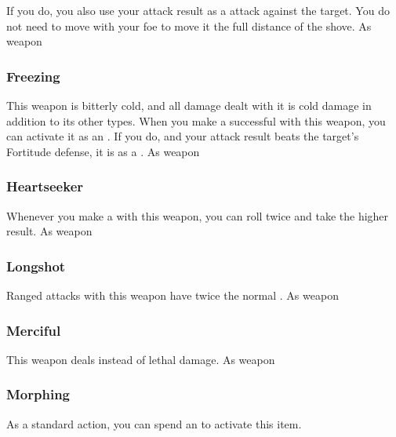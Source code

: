 If you do, you also use your attack result as a  attack against the target.
You do not need to move with your foe to move it the full distance of the shove.
 
 As weapon
\lowercase{\hypertarget{item:Freezing}{}}\label{item:Freezing}
\hypertarget{item:Freezing}{\subsubsection{Freezing\hfill{}}}
This weapon is bitterly cold, and all damage dealt with it is cold damage in addition to its other types.
When you make a successful  with this weapon, you can activate it as an .
If you do, and your attack result beats the target's Fortitude defense, it is \fatigued as a .
 
 As weapon
\lowercase{\hypertarget{item:Heartseeker}{}}\label{item:Heartseeker}
\hypertarget{item:Heartseeker}{\subsubsection{Heartseeker\hfill{}}}
Whenever you make a  with this weapon, you can roll twice and take the higher result.
 
 As weapon
\lowercase{\hypertarget{item:Longshot}{}}\label{item:Longshot}
\hypertarget{item:Longshot}{\subsubsection{Longshot\hfill{}}}
Ranged attacks with this weapon have twice the normal .
 
 As weapon
\lowercase{\hypertarget{item:Merciful}{}}\label{item:Merciful}
\hypertarget{item:Merciful}{\subsubsection{Merciful\hfill{}}}
This weapon deals  instead of lethal damage.
 
 As weapon
\lowercase{\hypertarget{item:Morphing}{}}\label{item:Morphing}
\hypertarget{item:Morphing}{\subsubsection{Morphing\hfill{}}}
As a standard action, you can spend an  to activate this item.
